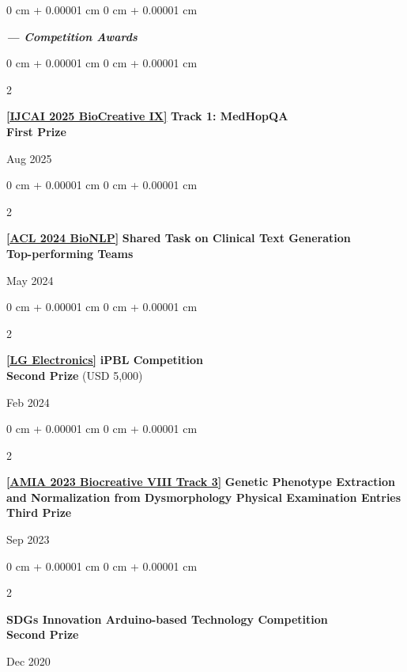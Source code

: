 \documentclass[11pt, letterpaper]{article}
\newenvironment{onecolentry}{
    \Needspace{3\baselineskip}
    \begin{adjustwidth}{
        0 cm + 0.00001 cm
    }{
        0 cm + 0.00001 cm
    }
}{
    \end{adjustwidth}
} %
\newenvironment{twocolentry}[2][]{
    \onecolentry
    \def\secondColumn{#2}
    \setcolumnwidth{\fill, 4.8 cm}
    \begin{paracol}{2}
}{
    \switchcolumn \raggedleft \secondColumn
    \end{paracol}
    \endonecolentry
} %
\begin{document}
    \begin{onecolentry}
        \textit{\textbf{--- Competition Awards}}
    \end{onecolentry}
    \vspace{0.15 cm}

    \begin{twocolentry}
    {
        Aug 2025
    }
    {
        \href{https://www.ncbi.nlm.nih.gov/research/bionlp/biocreative9}{\textbf{[IJCAI 2025 BioCreative IX]}} \textbf{Track 1: MedHopQA} \\
        \textbf{First Prize}
    }
    \end{twocolentry}

    \vspace{0.25 cm}
    \begin{twocolentry}
    {
        May 2024
    }
    {
        \href{https://stanford-aimi.github.io/discharge-me/}{\textbf{[ACL 2024 BioNLP]}} \textbf{Shared Task on Clinical Text Generation} \\
        \textbf{Top-performing Teams}
    }
    \end{twocolentry}

    \vspace{0.25 cm}
    \begin{twocolentry}
    {
        Feb 2024
    }
    {
        \href{https://blog.naver.com/engr1905/223377074561}{\textbf{[LG Electronics]}} \textbf{iPBL Competition} \\
        \textbf{Second Prize} (USD 5{,}000)
    }
    \end{twocolentry}

    \vspace{0.25 cm}
    \begin{twocolentry}
    {
        Sep 2023
    }
    {
        \href{https://biocreative.bioinformatics.udel.edu/events/biocreative-viii/biocreative-viii-challenge/}{\textbf{[AMIA 2023 Biocreative VIII Track 3]}} \textbf{Genetic Phenotype Extraction and Normalization from Dysmorphology Physical Examination Entries} \\
        \textbf{Third Prize}
    }
    \end{twocolentry}

    \vspace{0.25 cm}
    \begin{twocolentry}
    {
        Dec 2020
    }
    {
        \textbf{SDGs Innovation Arduino-based Technology Competition} \\
        \textbf{Second Prize}
    }
    \end{twocolentry}
\end{document}
